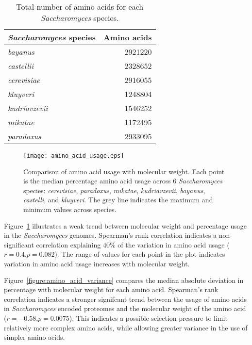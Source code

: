 \begin{table}
  \centering
  \begin{tabular}{ l r }
                                                  \toprule
    \emph{Saccharomyces} species & Amino acids \\ \midrule
    \emph{bayanus}               & 2921220     \\
    \emph{castellii}             & 2328652     \\
    \emph{cerevisiae}            & 2916055     \\
    \emph{kluyveri}              & 1248804     \\
    \emph{kudriavzevii}          & 1546252     \\
    \emph{mikatae}               & 1172495     \\
    \emph{paradoxus}             & 2933095     \\ \bottomrule
  \end{tabular}
  \caption{Total number of amino acids for each \emph{Saccharomyces} species.}
  \label{table:total_amino_acids}
\end{table}

\begin{figure}
  \centering
  \texttt{[image: amino\_acid\_usage.eps]}
  \caption[Comparison of amino acid usage with molecular weight]{Comparison of amino acid usage with molecular weight. Each point is the median percentage amino acid usage across 6 \emph{Saccharomyces} species: \emph{cerevisiae}, \emph{paradoxus}, \emph{mikatae}, \emph{kudriavzevii}, \emph{bayanus}, \emph{castelli}, and \emph{kluyveri}. The grey line indicates the maximum and minimum values across species.}
  \label{figure:amino_acid_usage}
\end{figure}

Figure~\ref{figure:amino_acid_usage} illustrates a weak trend between molecular weight and percentage usage in the \emph{Saccharomyces} genomes. Spearman's rank correlation indicates a non-significant correlation explaining 40\% of the variation in amino acid usage ($r = 0.4$,$p = 0.082$). The range of values for each point in the plot indicates variation in amino acid usage increases with molecular weight.

Figure~\vref{figure:amino_acid_variance} compares the median absolute deviation in percentage with molecular weight for each amino acid. Spearman's rank correlation indicates a stronger signifcant trend between the usage of amino acids in \emph{Saccharomyces} encoded proteomes and the molecular weight of the amino acid ($r = - 0.58$,$p = 0.0075$). This indicates a possible selection pressure to limit relatively more complex amino acids, while allowing greater variance in the use of simpler amino acids.

